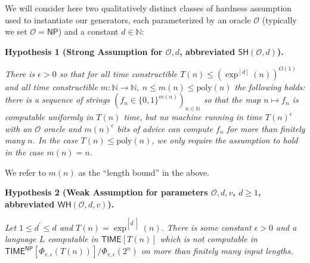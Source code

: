 We will consider here two qualitatively distinct classes of hardness assumption used to instantiate our generators, each parameterized by an oracle $\mathcal{O}$ (typically we set $\mathcal{O}={\mathsf{NP}}$) and a constant $d\in\mathbb{N}$:\par





\par\medskip\noindent\textbf{
\textbf{Hypothesis 1}\textbf{ }(Strong Assumption for $\mathcal{O},d$, abbreviated $\mathsf{SH}(\mathcal{O},d)$)\textbf{.}
}\par



\emph{There is $\epsilon>0$ so that for all time constructible $T(n)\leq(\exp^{[d]}(n))^{O(1)}$ and all time constructible $m:\mathbb{N}\to\mathbb{N}$, $n\leq m(n)\leq\mathrm{poly}(n)$ the following holds: there is a sequence of strings $(f_{n}\in\{0,1\}^{m(n)})_{n\in\mathbb{N}}$ so that the map $n\mapsto f_{n}$ is computable uniformly in $T(n)$ time, but no machine running in time $T(n)^{\epsilon}$ with an $\mathcal{O}$ oracle and $m(n)^{\epsilon}$ bits of advice can compute $f_{n}$ for more than finitely many $n$. In the case $T(n)\leq\mathrm{poly}(n)$, we only require the assumption to hold in the case $m(n)=n$.}\par






We refer to $m(n)$ as the “length bound” in the above.\par





\par\medskip\noindent\textbf{
\textbf{Hypothesis 2}\textbf{ }(Weak Assumption for parameters $\mathcal{O},d,v$, $d\geq 1$, abbreviated $\mathsf{WH}(\mathcal{O},d,v)$)\textbf{.}
}\par



\emph{Let $1\leq d^{\prime}\leq d$ and $T(n)=\exp^{[d^{\prime}]}(n)$. There is some constant $\epsilon>0$ and a language $L$ computable in ${\mathsf{TIME}}[T(n)]$ which is not computable in ${\mathsf{TIME}}^{\mathsf{NP}}[\Phi_{v,\epsilon}(T(n))]/\Phi_{v,\epsilon}(2^{n})$ on more than finitely many input lengths.}\par



